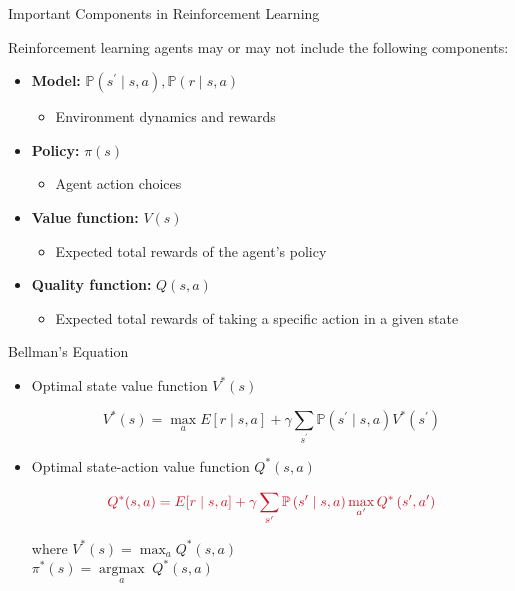 \documentclass[11pt,table]{beamer}
\begin{document}
\begin{frame}{Important	Components in Reinforcement Learning}


Reinforcement learning agents may or may not include the following components:
\vspace{3mm}

\begin{itemize}
    \item \textcolor{red1}{\textbf{Model:}} $\mathbb{P}\left(s^{\prime} \mid s, a\right), \mathbb{P}(r \mid s, a)$
\begin{itemize}

\item  Environment dynamics and rewards
\end{itemize}
\item \textcolor{red1}{\textbf{Policy:}} $\pi(s)$

\begin{itemize} 
\item Agent action choices
\end{itemize}
\item \textcolor{red1}{\textbf{Value function:}} $V(s)$

\begin{itemize}
\item  Expected total rewards of the agent's policy 
\end{itemize}
\pause
\item \textcolor{red1}{\textbf{Quality function:}} $Q(s,a)$

\begin{itemize}
\item  Expected total rewards of taking a specific action in a given state %
\end{itemize}
\end{itemize}
    
\end{frame}


\begin{frame}{Bellman's Equation}
\begin{itemize}
    \item Optimal state value function $V^{*}(s)$

$$
V^{*}(s)=\max _{a} E[r \mid s, a]+\gamma \sum_{s^{\prime}} \mathbb{P}\left(s^{\prime} \mid s, a\right) V^{*}\left(s^{\prime}\right)
$$

\item Optimal state-action value function $Q^{*}(s, a)$

$$
\textcolor{red1}{Q^{*}(s, a)=E[r\mid s,a]+\gamma \sum_{s^{\prime}} \mathbb{P}\left(s^{\prime}\mid s,a\right) \max _{a^{\prime}} Q^{*}\left(s^{\prime}, a^{\prime}\right)}
$$

where $V^{*}(s)=\max _{a} Q^{*}(s, a)$\\
\quad\quad\quad $
\pi^{*}(s)=\underset{a}{\operatorname{argmax}} \; Q^{*}(s, a)
$ 
\end{itemize}    
\end{frame}
\end{document}
